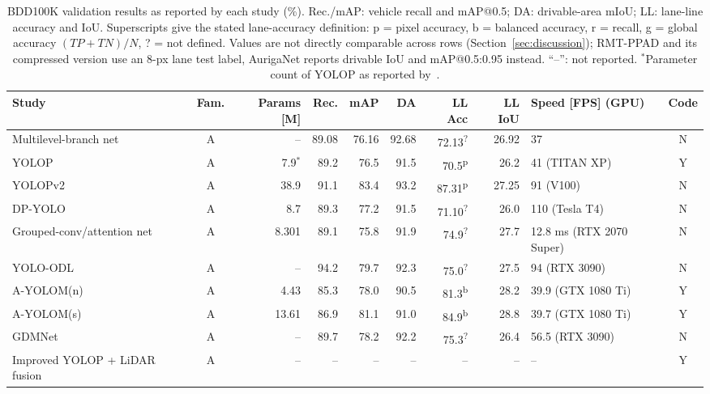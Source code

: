 \begin{table}[!htbp]
\centering
\caption{BDD100K validation results as reported by each study (\%). Rec./mAP: vehicle recall and mAP@0.5; DA: drivable-area mIoU; LL: lane-line accuracy and IoU. Superscripts give the stated lane-accuracy definition: p = pixel accuracy, b = balanced accuracy, r = recall, g = global accuracy $(TP+TN)/N$, ? = not defined. Values are not directly comparable across rows (Section~\ref{sec:discussion}); RMT-PPAD and its compressed version use an 8-px lane test label, AurigaNet reports drivable IoU and mAP@0.5:0.95 instead. ``--'': not reported. $^*$Parameter count of YOLOP as reported by~\cite{vu2025hybridnets,wang2024ayolom}.}
\label{tab:comparison}
\scriptsize
\setlength{\tabcolsep}{3pt}
\begin{tabularx}{\linewidth}{L{3.3cm} c r r r r r r X c}
\toprule
Study & Fam. & Params [M] & Rec. & mAP & DA & LL Acc & LL IoU & Speed [FPS] (GPU) & Code \\
\midrule
Multilevel-branch net~\cite{kim2022joint} & A & -- & 89.08 & 76.16 & 92.68 & 72.13\textsuperscript{?} & 26.92 & 37 & N \\
YOLOP~\cite{wu2022yolop} & A & 7.9$^*$ & 89.2 & 76.5 & 91.5 & 70.5\textsuperscript{p} & 26.2 & 41 (TITAN XP) & Y \\
YOLOPv2~\cite{han2022yolopv2} & A & 38.9 & 91.1 & 83.4 & 93.2 & 87.31\textsuperscript{p} & 27.25 & 91 (V100) & N \\
DP-YOLO~\cite{zeng2023dpyolo} & A & 8.7 & 89.3 & 77.2 & 91.5 & 71.10\textsuperscript{?} & 26.0 & 110 (Tesla T4) & N \\
Grouped-conv/attention net~\cite{ma2023grouped} & A & 8.301 & 89.1 & 75.8 & 91.9 & 74.9\textsuperscript{?} & 27.7 & 12.8 ms (RTX 2070 Super) & N \\
YOLO-ODL~\cite{guo2023yoloodl} & A & -- & 94.2 & 79.7 & 92.3 & 75.0\textsuperscript{?} & 27.5 & 94 (RTX 3090) & N \\
A-YOLOM(n)~\cite{wang2024ayolom} & A & 4.43 & 85.3 & 78.0 & 90.5 & 81.3\textsuperscript{b} & 28.2 & 39.9 (GTX 1080 Ti) & Y \\
A-YOLOM(s)~\cite{wang2024ayolom} & A & 13.61 & 86.9 & 81.1 & 91.0 & 84.9\textsuperscript{b} & 28.8 & 39.7 (GTX 1080 Ti) & Y \\
GDMNet~\cite{liu2024gdmnet} & A & -- & 89.7 & 78.2 & 92.2 & 75.3\textsuperscript{?} & 26.4 & 56.5 (RTX 3090) & N \\
Improved YOLOP + LiDAR fusion~\cite{liu2024fusion} & A & -- & -- & -- & -- & -- & -- & -- & Y \\

\end{tabularx}
\end{table}
